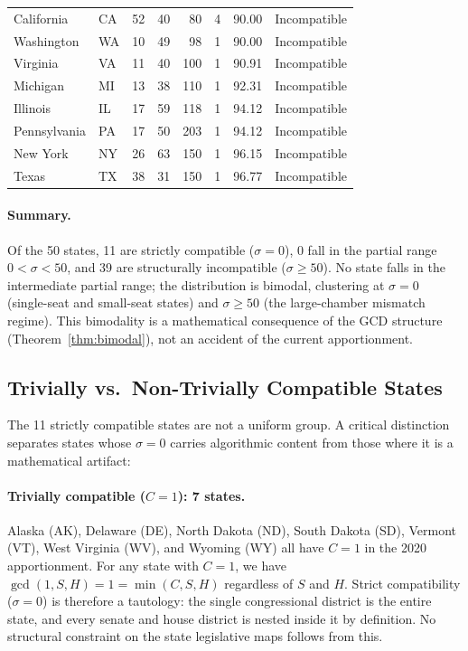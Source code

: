 \begin{longtable}{llrrrrrl}
California    & CA & 52 &  40 &  80 & 4 &  90.00 & Incompatible \\
Washington    & WA & 10 &  49 &  98 & 1 &  90.00 & Incompatible \\
Virginia      & VA & 11 &  40 & 100 & 1 &  90.91 & Incompatible \\
Michigan      & MI & 13 &  38 & 110 & 1 &  92.31 & Incompatible \\
Illinois      & IL & 17 &  59 & 118 & 1 &  94.12 & Incompatible \\
Pennsylvania  & PA & 17 &  50 & 203 & 1 &  94.12 & Incompatible \\
New York      & NY & 26 &  63 & 150 & 1 &  96.15 & Incompatible \\
Texas         & TX & 38 &  31 & 150 & 1 &  96.77 & Incompatible \\
\end{longtable}

\paragraph{Summary.}  Of the 50 states, 11 are strictly compatible ($\sigma = 0$),
0 fall in the partial range $0 < \sigma < 50$, and 39 are structurally
incompatible ($\sigma \geq 50$).  No state falls in the intermediate partial
range; the distribution is bimodal, clustering at $\sigma = 0$ (single-seat
and small-seat states) and $\sigma \geq 50$ (the large-chamber mismatch regime).
This bimodality is a mathematical consequence of the GCD structure
(Theorem~\ref{thm:bimodal}), not an accident of the current apportionment.

\subsection{Trivially vs.\ Non-Trivially Compatible States}
\label{subsec:trivial}

The 11 strictly compatible states are not a uniform group.  A critical
distinction separates states whose $\sigma = 0$ carries algorithmic content
from those where it is a mathematical artifact:

\paragraph{Trivially compatible ($C = 1$): 7 states.}
Alaska (AK), Delaware (DE), North Dakota (ND), South Dakota (SD), Vermont (VT),
West Virginia (WV), and Wyoming (WY) all have $C = 1$ in the 2020 apportionment.
For any state with $C = 1$, we have $\gcd(1, S, H) = 1 = \min(C,S,H)$
regardless of $S$ and $H$.  Strict compatibility ($\sigma = 0$) is therefore
a tautology: the single congressional district is the entire state, and every
senate and house district is nested inside it by definition.  No structural
constraint on the state legislative maps follows from this.

